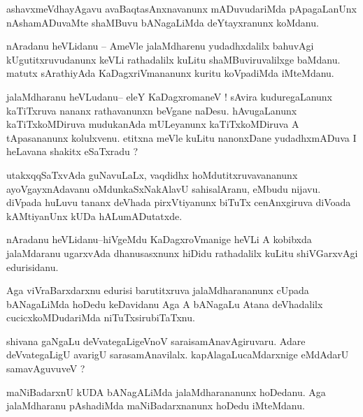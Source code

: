 \documentclass{article}
\begin{document}
\begin{mn}%
ashavxmeVdhayAgavu avaBaqtasAnxnavanunx mADuvudariMda pApagaLanUnx nAshamADuvaMte shaMBuvu 
bANagaLiMda deYtayxranunx koMdanu.
\end{mn}


\begin{mn}%
nAradanu heVLidanu -- AmeVle jalaMdharenu yudadhxdalilx bahuvAgi kUgutitxruvudanunx keVLi 
rathadalilx kuLitu shaMBuviruvalilxge baMdanu. matutx sArathiyAda KaDagxriVmananunx kuritu 
koVpadiMda iMteMdanu.
\end{mn}

\begin{mn}%
jalaMdharanu heVLudanu-- eleY KaDagxromaneV ! sAvira kuduregaLanunx kaTiTxruva nananx 
rathavanunxn beVgane naDesu. hAvugaLanunx kaTiTxkoMDiruva mudukanAda mULeyanunx 
kaTiTxkoMDiruva A tApasananunx kolulxvenu. etitxna meVle kuLitu nanonxDane yudadhxmADuva I 
heLavana shakitx eSaTxradu ?
\end{mn}

\begin{mn}%
utakxqqSaTxvAda guNavuLaLx, vaqdidhx hoMdutitxruvavananunx ayoVgayxnAdavanu oMdunkaSxNakAlavU 
sahisalAranu, eMbudu nijavu. diVpada huLuvu tananx deVhada pirxVtiyanunx biTuTx cenAnxgiruva 
diVoada kAMtiyanUnx kUDa hALumADutatxde.
\end{mn}

\begin{mn}%
nAradanu heVLidanu--hiVgeMdu KaDagxroVmanige heVLi A kobibxda jalaMdaranu ugarxvAda 
dhanusasxnunx hiDidu rathadalilx kuLitu shiVGarxvAgi edurisidanu.
\end{mn}

\begin{mn}%
Aga viVraBarxdarxnu edurisi barutitxruva jalaMdharananunx cUpada bANagaLiMda hoDedu 
keDavidanu Aga A bANagaLu Atana deVhadalilx cucicxkoMDudariMda niTuTxsirubiTaTxnu.
\end{mn}

\begin{mn}%
shivana gaNgaLu deVvategaLigeVnoV saraisamAnavAgiruvaru. Adare deVvategaLigU avarigU 
sarasamAnavilalx. kapAlagaLucaMdarxnige eMdAdarU samavAguvuveV ?
\end{mn}

\begin{mn}%
maNiBadarxnU kUDA bANagALiMda jalaMdharananunx hoDedanu. Aga jalaMdharanu pAshadiMda 
maNiBadarxnanunx hoDedu iMteMdanu.
\end{mn}
\end{document}
